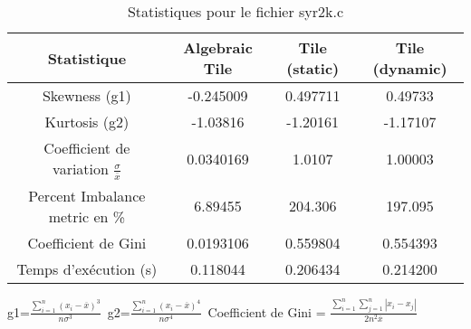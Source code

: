 \documentclass{article}
\begin{document}
\begin{table}[htbp]
  \centering
  \caption{Statistiques pour le fichier syr2k.c}
  \begin{tabular}{|c|c|c|c|}
    \hline
    Statistique & Algebraic Tile & Tile (static) & Tile (dynamic) \\ 
    \hline
    Skewness (g1)  & -0.245009 & 0.497711 & 0.49733 \\ 
    Kurtosis (g2)  & -1.03816 & -1.20161 & -1.17107 \\ 
    Coefficient de variation $ \frac{\sigma}{\overline{x}} $ & 0.0340169 & 1.0107 & 1.00003\\ 
    Percent Imbalance metric en \% & 6.89455 & 204.306 & 197.095\\ 
    Coefficient de Gini  & 0.0193106 & 0.559804 & 0.554393\\ 
    Temps d'exécution (s) &  0.118044    &  0.206434   &  0.214200   \\ 

    \hline
  \end{tabular}
\end{table}
g1=$ \frac{\sum_{i=1}^{n} (x_i - \overline{x})^3}{n\sigma^3} $\
g2=$ \frac{\sum_{i=1}^{n} (x_i - \overline{x})^4}{n\sigma^4} $\
Coefficient de Gini = $ \frac{\sum_{i=1}^{n}\sum_{j=1}^{n} |x_i - x_j|}{2n^2\overline{x}} $\
\newpage
\end{document}

